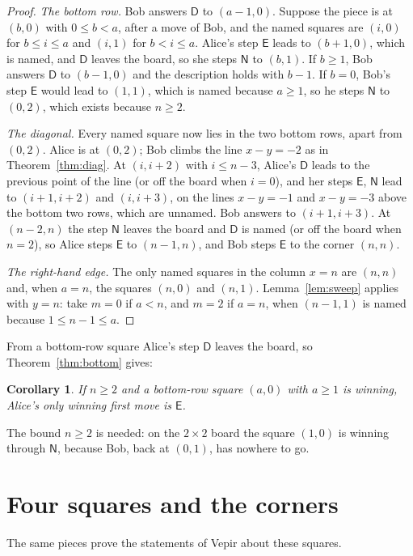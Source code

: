 \documentclass[11pt]{article}
\newtheorem{corollary}[theorem]{Corollary}
\theoremstyle{remark}
\newcommand{\E}{\mathsf{E}}
\newcommand{\N}{\mathsf{N}}
\newcommand{\D}{\mathsf{D}}
\begin{document}
\begin{proof}
\emph{The bottom row.} Bob answers $\D$ to $(a-1,0)$. Suppose the piece is at $(b,0)$ with
$0\le b<a$, after a move of Bob, and the named squares are $(i,0)$ for $b\le i\le a$ and $(i,1)$
for $b<i\le a$. Alice's step $\E$ leads to $(b+1,0)$, which is named, and $\D$ leaves the board,
so she steps $\N$ to $(b,1)$. If $b\ge1$, Bob answers $\D$ to $(b-1,0)$ and the description
holds with $b-1$. If $b=0$, Bob's step $\E$ would lead to $(1,1)$, which is named because
$a\ge1$, so he steps $\N$ to $(0,2)$, which exists because $n\ge2$.

\emph{The diagonal.} Every named square now lies in the two bottom rows, apart from $(0,2)$.
Alice is at $(0,2)$; Bob climbs the line $x-y=-2$ as in Theorem~\ref{thm:diag}. At $(i,i+2)$ with
$i\le n-3$, Alice's $\D$ leads to the previous point of the line (or off the board when $i=0$),
and her steps $\E$, $\N$ lead to $(i+1,i+2)$ and $(i,i+3)$, on the lines $x-y=-1$ and $x-y=-3$
above the bottom two rows, which are unnamed. Bob answers to $(i+1,i+3)$. At $(n-2,n)$ the step
$\N$ leaves the board and $\D$ is named (or off the board when $n=2$), so Alice steps $\E$ to
$(n-1,n)$, and Bob steps $\E$ to the corner $(n,n)$.

\emph{The right-hand edge.} The only named squares in the column $x=n$ are $(n,n)$ and, when
$a=n$, the squares $(n,0)$ and $(n,1)$. Lemma~\ref{lem:sweep} applies with $y=n$: take $m=0$ if
$a<n$, and $m=2$ if $a=n$, when $(n-1,1)$ is named because $1\le n-1\le a$.
\end{proof}

From a bottom-row square Alice's step $\D$ leaves the board, so Theorem~\ref{thm:bottom} gives:

\begin{corollary}\label{cor:bottom}
If $n\ge2$ and a bottom-row square $(a,0)$ with $a\ge1$ is winning, Alice's only winning first
move is $\E$.
\end{corollary}

The bound $n\ge 2$ is needed: on the $2\times 2$ board the square $(1,0)$ is winning through
$\N$, because Bob, back at $(0,1)$, has nowhere to go.

\section{Four squares and the corners}

The same pieces prove the statements of Vepir about these squares.
\end{document}
